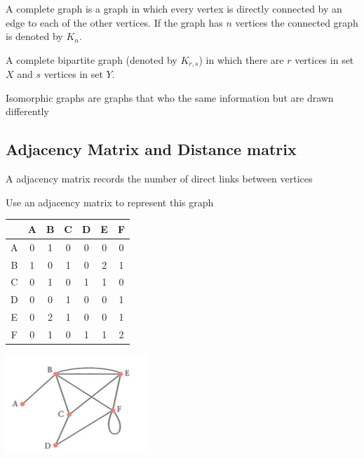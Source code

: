 \documentclass[a4paper]{article}
\begin{document}
\newpage

\begin{defi}
A complete graph is a graph in which every vertex is directly connected by an edge to each of the other vertices. If the graph has $n$ vertices the connected graph is denoted by $K_n$.
\end{defi}


\begin{defi}
A complete bipartite graph (denoted by $K_{r,s}$) in which there are $r$ vertices in set $X$ and $s$ vertices in set $Y$.
\end{defi}


\begin{defi}
Isomorphic graphs are graphs that who the same information but are drawn differently
\end{defi}

\subsection{Adjacency Matrix and Distance matrix}
\begin{defi}
A adjacency matrix records the number of direct links between vertices
\end{defi}

\begin{eg}
Use an adjacency matrix to represent this graph\\

\begin{tabular}{c|cccccc}
   &A&B&C&D&E&F\\
 \hline
 A&0&1&0&0&0&0\\
 B&1&0&1&0&2&1\\
 C&0&1&0&1&1&0\\
 D&0&0&1&0&0&1\\
 E&0&2&1&0&0&1\\
 F&0&1&0&1&1&2\\
\end{tabular}
\includegraphics{img_D/2_2ex1}
\end{eg}
\end{document}
